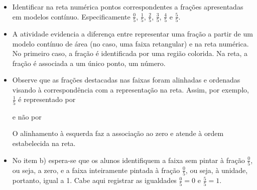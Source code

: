 \vfill

\begin{objetivos}[label=chap3-ativ5]{}{}

  \begin{itemize} %
    \item Identificar na reta numérica pontos correspondentes a frações apresentadas em modelos contínuo. Especificamente    $\frac{0}{5}$,  $\frac{1}{5}$,       $\frac{2}{5}$,       $\frac{3}{5}$, $\frac{4}{5}$ e $\frac{5}{5}$.
\end{itemize} %
\end{objetivos}

\begin{orientacoes}{}{}
\begin{itemize} %
    \item A atividade evidencia a diferença entre representar uma fração a partir de um modelo contínuo de área (no caso, uma faixa retangular) e na reta numérica. No primeiro caso, a fração é identificada por uma região colorida. Na reta, a fração é associada a um único ponto, um número.
    \item Observe que as frações destacadas nas faixas foram alinhadas e ordenadas visando à correspondência com a representação na reta.  Assim, por exemplo, $\frac{1}{5}$ é representado por
      e não por       
O alinhamento à esquerda faz a associação ao zero e atende à ordem estabelecida na reta.
\item       No item b) espera-se que os alunos identifiquem a faixa sem pintar à fração $\frac{0}{5}$, ou seja, a zero, e a faixa inteiramente pintada à fração $\frac{0}{5}$, ou seja, à unidade, portanto, igual a 1. Cabe aqui registrar as igualdades $\frac{0}{5}=0$ e $\frac{5}{5}=1$.

\end{itemize} %
\end{orientacoes}
